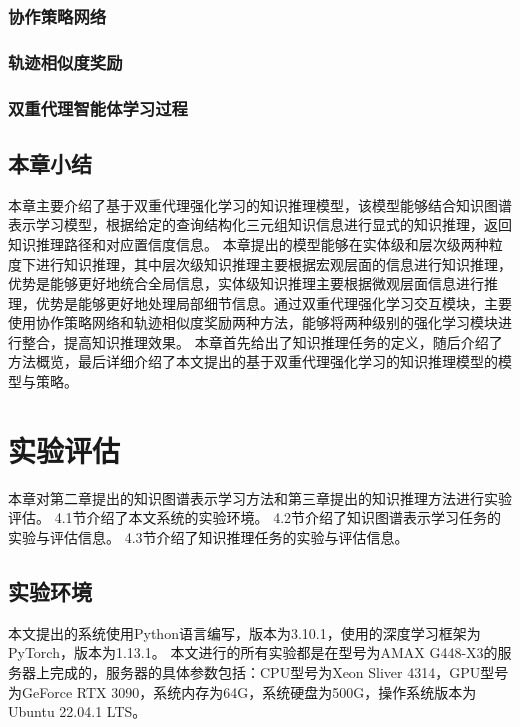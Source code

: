 \documentclass[algorithmlist, AutoFakeBold, AutoFakeSlant, figurelist, tablelist, nomlist, masters]{seuthesix}
\begin{document}
\subsection{协作策略网络}


\subsection{轨迹相似度奖励}


\subsection{双重代理智能体学习过程}


\section{本章小结}
本章主要介绍了基于双重代理强化学习的知识推理模型，该模型能够结合知识图谱表示学习模型，根据给定的查询结构化三元组知识信息进行显式的知识推理，返回知识推理路径和对应置信度信息。
本章提出的模型能够在实体级和层次级两种粒度下进行知识推理，其中层次级知识推理主要根据宏观层面的信息进行知识推理，优势是能够更好地统合全局信息，实体级知识推理主要根据微观层面信息进行推理，优势是能够更好地处理局部细节信息。通过双重代理强化学习交互模块，主要使用协作策略网络和轨迹相似度奖励两种方法，能够将两种级别的强化学习模块进行整合，提高知识推理效果。
本章首先给出了知识推理任务的定义，随后介绍了方法概览，最后详细介绍了本文提出的基于双重代理强化学习的知识推理模型的模型与策略。


\chapter{实验评估}
本章对第二章提出的知识图谱表示学习方法和第三章提出的知识推理方法进行实验评估。
4.1节介绍了本文系统的实验环境。
4.2节介绍了知识图谱表示学习任务的实验与评估信息。
4.3节介绍了知识推理任务的实验与评估信息。

\section{实验环境}
本文提出的系统使用Python语言编写，版本为3.10.1，使用的深度学习框架为PyTorch，版本为1.13.1。
本文进行的所有实验都是在型号为AMAX G448-X3的服务器上完成的，服务器的具体参数包括：CPU型号为Xeon Sliver 4314，GPU型号为GeForce RTX 3090，系统内存为64G，系统硬盘为500G，操作系统版本为Ubuntu 22.04.1 LTS。
\end{document}
